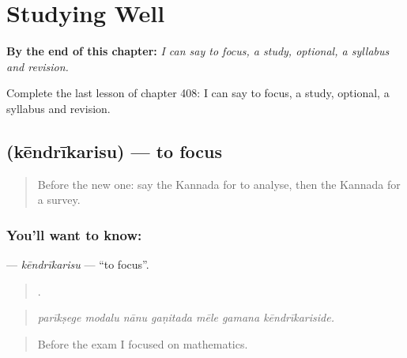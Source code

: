 
\chapter{Studying Well}
\label{ch:ka-studying-well}

\begin{chapteropening}
\textbf{By the end of this chapter:} \emph{I can say to focus, a study, optional, a syllabus and revision.}

Complete the last lesson of chapter 408: I can say to focus, a study, optional, a syllabus and revision.
\end{chapteropening}

\section[\texorpdfstring{\kn{ಕೇಂದ್ರೀಕರಿಸು} (kēndrīkarisu)}{ಕೇಂದ್ರೀಕರಿಸು (kēndrīkarisu)}]{ (kēndrīkarisu) — to focus}

\label{lesson:KA-C408-kendrikarisu}



\begin{quote}
Before the new one: say the Kannada for to analyse, then the Kannada for a survey.
\end{quote}

\subsection*{You'll want to know: }
\textbf{} — \emph{kēndrīkarisu} — \textquotedblleft{}to focus\textquotedblright{}.

\begin{quote}
      .
\end{quote}

\begin{quote}
\emph{parīkṣege modalu nānu gaṇitada mēle gamana kēndrīkariside.}
\end{quote}

\begin{quote}
Before the exam I focused on mathematics.
\end{quote}

